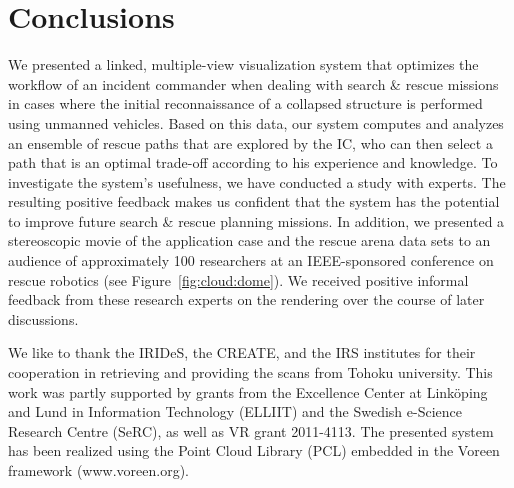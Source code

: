 \documentclass[conference,10pt,letter]{IEEEtran}
\def\IC{IC}
\begin{document}

\section{Conclusions} \label{sec:conclusion}
We presented a linked, multiple-view visualization system that optimizes the workflow of an incident commander when dealing with search \& rescue missions in cases where the initial reconnaissance of a collapsed structure is performed using unmanned vehicles. Based on this data, our system computes and analyzes an ensemble of rescue paths that are explored by the \IC , who can then select a path that is an optimal trade-off according to his experience and knowledge. To investigate the system's usefulness, we have conducted a study with experts. The resulting positive feedback makes us confident that the system has the potential to improve future search \& rescue planning missions. In addition, we presented a stereoscopic movie of the application case and the rescue arena data sets to an audience of approximately 100 researchers at an IEEE-sponsored conference on rescue robotics (see Figure~\ref{fig:cloud:dome}). We received positive informal feedback from these research experts on the rendering over the course of later discussions.




We like to thank the IRIDeS, the CREATE, and the IRS institutes for their cooperation in retrieving and providing the scans from Tohoku university. This work was partly supported by grants from the Excellence Center at Link\"oping and Lund in Information Technology (ELLIIT) and the Swedish e-Science Research Centre (SeRC), as well as VR grant 2011-4113.
The presented system has been realized using the Point Cloud Library (PCL) embedded in the Voreen framework (www.voreen.org).

%
%



\end{document}
